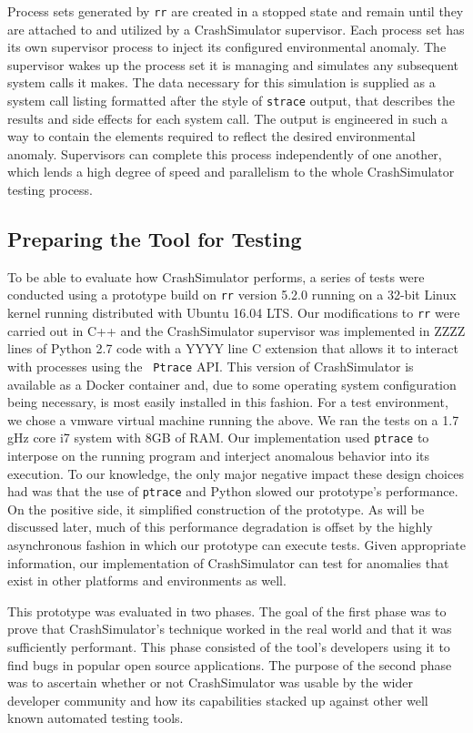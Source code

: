 Process sets generated by {\tt rr} are created in a stopped state and
remain until they are attached to and utilized by a CrashSimulator
supervisor.  Each process set has its own supervisor process to inject
its configured environmental anomaly.  The
supervisor wakes up the process set it is managing and simulates any
subsequent system calls it makes.  The data necessary for this
simulation is
supplied as a system call listing formatted after the style of {\tt strace}
output, that describes the results and side effects for each system
call. The output is engineered in such a way to contain the
elements required to reflect the
desired environmental anomaly.  Supervisors can complete this
process independently of one another, which lends a
high degree of speed and
parallelism to the whole CrashSimulator testing process.

\subsection{Preparing the Tool for Testing}

To be able to evaluate how CrashSimulator performs, a series of tests were
conducted using a prototype build on {\tt rr} version 5.2.0 running on a
32-bit Linux kernel running distributed with  Ubuntu 16.04 LTS.  Our
modifications to {\tt rr} were carried out in C++ and the CrashSimulator
supervisor was implemented in ZZZZ lines of Python 2.7 code with a YYYY
line C extension that allows it to interact with processes using the {\tt
Ptrace} API.  This version of CrashSimulator is available as a Docker
container and, due to some operating system configuration being necessary,
is most easily installed in this fashion.  For a test environment, we chose
a vmware virtual machine running the above.  We ran the tests on a 1.7 gHz
core i7 system with 8GB of RAM. Our implementation used {\tt ptrace} to
interpose on the running program and interject anomalous behavior into its
execution.  To our knowledge, the only major negative impact these design
choices had was that the use of {\tt ptrace} and Python slowed our
prototype's performance.  On the positive side, it simplified construction
of the prototype.  As will be discussed later, much of this performance
degradation is offset by the highly asynchronous fashion in which our
prototype can execute tests. Given appropriate information, our
implementation of CrashSimulator can test for anomalies that exist in other
platforms and environments as well.

This prototype was evaluated in two phases.  The goal of the first phase
was to prove that CrashSimulator's technique worked in the real world and
that it was sufficiently performant.  This phase consisted of
the tool's developers using it to find bugs in popular open
source applications.  The purpose of the second phase was to ascertain
whether or not CrashSimulator was usable by the wider developer community
and how its capabilities stacked up against other well known automated
testing tools.
